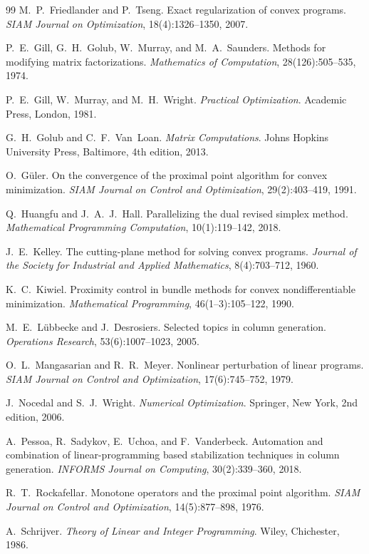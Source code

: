 \begin{thebibliography}{99}
M.~P.~Friedlander and P.~Tseng.
\newblock Exact regularization of convex programs.
\newblock \emph{SIAM Journal on Optimization}, 18(4):1326--1350, 2007.

P.~E.~Gill, G.~H.~Golub, W.~Murray, and M.~A.~Saunders.
\newblock Methods for modifying matrix factorizations.
\newblock \emph{Mathematics of Computation}, 28(126):505--535, 1974.

P.~E.~Gill, W.~Murray, and M.~H.~Wright.
\newblock \emph{Practical Optimization}.
\newblock Academic Press, London, 1981.

G.~H.~Golub and C.~F.~Van~Loan.
\newblock \emph{Matrix Computations}.
\newblock Johns Hopkins University Press, Baltimore, 4th edition, 2013.

O.~G\"uler.
\newblock On the convergence of the proximal point algorithm for convex minimization.
\newblock \emph{SIAM Journal on Control and Optimization}, 29(2):403--419, 1991.

Q.~Huangfu and J.~A.~J.~Hall.
\newblock Parallelizing the dual revised simplex method.
\newblock \emph{Mathematical Programming Computation}, 10(1):119--142, 2018.

J.~E.~Kelley.
\newblock The cutting-plane method for solving convex programs.
\newblock \emph{Journal of the Society for Industrial and Applied Mathematics},
  8(4):703--712, 1960.

K.~C.~Kiwiel.
\newblock Proximity control in bundle methods for convex nondifferentiable minimization.
\newblock \emph{Mathematical Programming}, 46(1--3):105--122, 1990.

M.~E.~L\"ubbecke and J.~Desrosiers.
\newblock Selected topics in column generation.
\newblock \emph{Operations Research}, 53(6):1007--1023, 2005.

O.~L.~Mangasarian and R.~R.~Meyer.
\newblock Nonlinear perturbation of linear programs.
\newblock \emph{SIAM Journal on Control and Optimization}, 17(6):745--752, 1979.

J.~Nocedal and S.~J.~Wright.
\newblock \emph{Numerical Optimization}.
\newblock Springer, New York, 2nd edition, 2006.

A.~Pessoa, R.~Sadykov, E.~Uchoa, and F.~Vanderbeck.
\newblock Automation and combination of linear-programming based stabilization techniques
  in column generation.
\newblock \emph{INFORMS Journal on Computing}, 30(2):339--360, 2018.

R.~T.~Rockafellar.
\newblock Monotone operators and the proximal point algorithm.
\newblock \emph{SIAM Journal on Control and Optimization}, 14(5):877--898, 1976.


A.~Schrijver.
\newblock \emph{Theory of Linear and Integer Programming}.
\newblock Wiley, Chichester, 1986.

\end{thebibliography}
